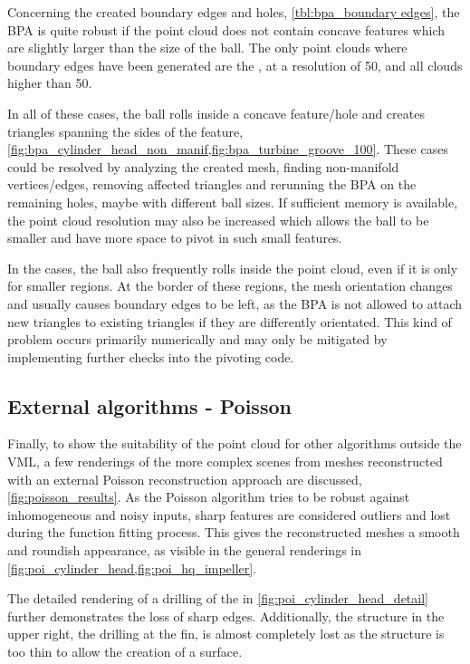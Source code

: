 Concerning the created boundary edges and holes, \cf \cref{tbl:bpa_boundary edges}, the BPA is quite robust if the point cloud does not contain concave features which are slightly larger than the size of the ball.
The only point clouds where boundary edges have been generated are the \cylinderhead, at a resolution of 50, and all \turbine clouds higher than 50.

In all of these cases, the ball rolls inside a concave feature/hole and creates triangles spanning the sides of the feature, \cf \cref{fig:bpa_cylinder_head_non_manif,fig:bpa_turbine_groove_100}.
These cases could be resolved by analyzing the created mesh, finding non-manifold vertices/edges, removing affected triangles and rerunning the BPA on the remaining holes, maybe with different ball sizes.
If sufficient memory is available, the point cloud resolution may also be increased which allows the ball to be smaller and have more space to pivot in such small features.

In the \turbine cases, the ball also frequently rolls inside the point cloud, even if it is only for smaller regions.
At the border of these regions, the mesh orientation changes and usually causes boundary edges to be left, as the BPA is not allowed to attach new triangles to existing triangles if they are differently orientated.
This kind of problem occurs primarily numerically and may only be mitigated by implementing further checks into the pivoting code.


\subsection{External algorithms - Poisson}

Finally, to show the suitability of the point cloud for other algorithms outside the VML, a few renderings of the more complex scenes from meshes reconstructed with an external Poisson reconstruction approach are discussed, \cf \cref{fig:poisson_results}.
As the Poisson algorithm tries to be robust against inhomogeneous and noisy inputs, sharp features are considered outliers and lost during the function fitting process.
This gives the reconstructed meshes a smooth and roundish appearance, as visible in the general renderings in \cref{fig:poi_cylinder_head,fig:poi_hq_impeller}.

The detailed rendering of a drilling of the \cylinderhead in \cref{fig:poi_cylinder_head_detail} further demonstrates the loss of sharp edges.
Additionally, the structure in the upper right, the drilling at the fin, is almost completely lost as the structure is too thin to allow the creation of a surface.

